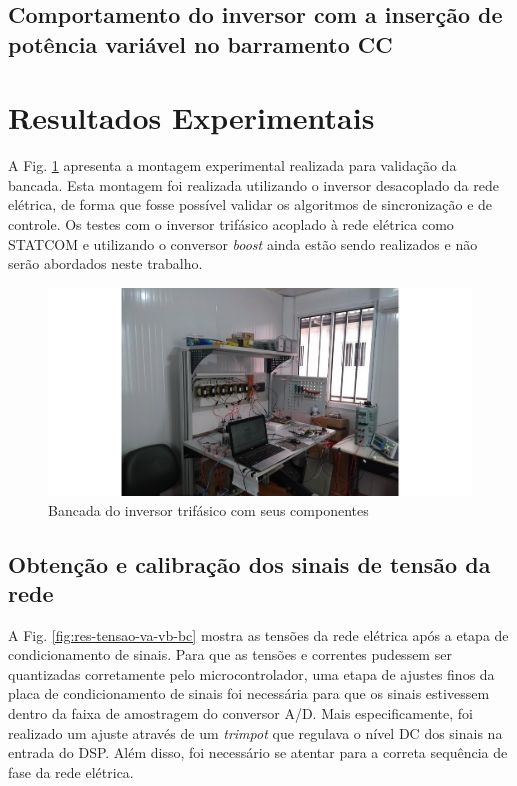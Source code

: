 \subsection{Comportamento do inversor com a inserção de potência variável no barramento CC}

\section{Resultados Experimentais}

A Fig. \ref{fig:res-bancada-inversor} apresenta a montagem experimental realizada para validação da bancada.
Esta montagem foi realizada utilizando o inversor desacoplado da rede elétrica, de forma que fosse possível validar
os algoritmos de sincronização e de controle. Os testes com o inversor trifásico acoplado à rede elétrica como STATCOM e
utilizando o conversor \textit{boost} ainda estão sendo realizados e não serão abordados neste trabalho.

\begin{figure}[!hbt]
	\begin{center}
    \includegraphics[width=\textwidth]{figuras/resultados-montagem-laboratorial.png}
    \caption{Bancada do inversor trifásico com seus componentes}
    \label{fig:res-bancada-inversor}
    \end{center}
\end{figure}

\subsection{Obtenção e calibração dos sinais de tensão da rede}

A Fig. \ref{fig:res-tensao-va-vb-bc} mostra as tensões da rede elétrica após a etapa de condicionamento de sinais.
Para que as tensões e correntes pudessem ser quantizadas corretamente pelo microcontrolador, 
uma etapa de ajustes finos da placa de condicionamento de sinais foi necessária para que os sinais estivessem dentro da faixa de amostragem do conversor A/D.
Mais especificamente, foi realizado um ajuste através de um \textit{trimpot} que regulava o nível DC dos sinais na entrada do DSP.
Além disso, foi necessário se atentar para a correta sequência de fase da rede elétrica.

